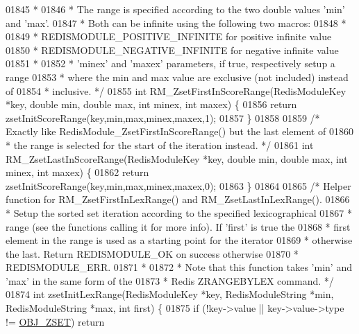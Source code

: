 \begin{DoxyCode}
{{{01845 \textcolor{comment}{ *}
01846 \textcolor{comment}{ * The range is specified according to the two double values 'min' and 'max'.}
01847 \textcolor{comment}{ * Both can be infinite using the following two macros:}
01848 \textcolor{comment}{ *}
01849 \textcolor{comment}{ * REDISMODULE\_POSITIVE\_INFINITE for positive infinite value}
01850 \textcolor{comment}{ * REDISMODULE\_NEGATIVE\_INFINITE for negative infinite value}
01851 \textcolor{comment}{ *}
01852 \textcolor{comment}{ * 'minex' and 'maxex' parameters, if true, respectively setup a range}
01853 \textcolor{comment}{ * where the min and max value are exclusive (not included) instead of}
01854 \textcolor{comment}{ * inclusive. */}
01855 \textcolor{keywordtype}{int} RM\_ZsetFirstInScoreRange(RedisModuleKey *key, \textcolor{keywordtype}{double} min, \textcolor{keywordtype}{double} max, \textcolor{keywordtype}{int} minex, \textcolor{keywordtype}{int} maxex) \{
01856     \textcolor{keywordflow}{return} zsetInitScoreRange(key,min,max,minex,maxex,1);
01857 \}
01858 
01859 \textcolor{comment}{/* Exactly like RedisModule\_ZsetFirstInScoreRange() but the last element of}
01860 \textcolor{comment}{ * the range is selected for the start of the iteration instead. */}
01861 \textcolor{keywordtype}{int} RM\_ZsetLastInScoreRange(RedisModuleKey *key, \textcolor{keywordtype}{double} min, \textcolor{keywordtype}{double} max, \textcolor{keywordtype}{int} minex, \textcolor{keywordtype}{int} maxex) \{
01862     \textcolor{keywordflow}{return} zsetInitScoreRange(key,min,max,minex,maxex,0);
01863 \}
01864 
01865 \textcolor{comment}{/* Helper function for RM\_ZsetFirstInLexRange() and RM\_ZsetLastInLexRange().}
01866 \textcolor{comment}{ * Setup the sorted set iteration according to the specified lexicographical}
01867 \textcolor{comment}{ * range (see the functions calling it for more info). If 'first' is true the}
01868 \textcolor{comment}{ * first element in the range is used as a starting point for the iterator}
01869 \textcolor{comment}{ * otherwise the last. Return REDISMODULE\_OK on success otherwise}
01870 \textcolor{comment}{ * REDISMODULE\_ERR.}
01871 \textcolor{comment}{ *}
01872 \textcolor{comment}{ * Note that this function takes 'min' and 'max' in the same form of the}
01873 \textcolor{comment}{ * Redis ZRANGEBYLEX command. */}
01874 \textcolor{keywordtype}{int} zsetInitLexRange(RedisModuleKey *key, RedisModuleString *min, RedisModuleString *max, \textcolor{keywordtype}{int} first) \{
01875     \textcolor{keywordflow}{if} (!key->value || key->value->type != \hyperlink{server_8h_a8c356422ddbc03bd77694880a30a1953}{OBJ\_ZSET}) \textcolor{keywordflow}{return} 
}}}
\end{DoxyCode}
